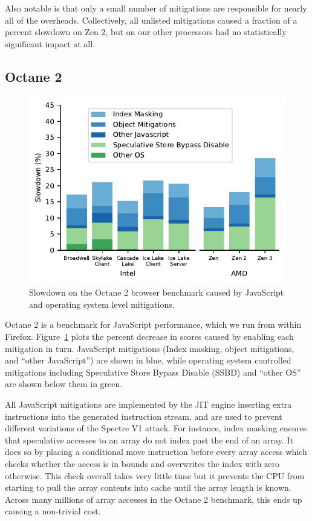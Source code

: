 Also notable is that only a small number of mitigations are responsible for nearly all of the overheads.
Collectively, all unlisted mitigations caused a fraction of a percent slowdown on Zen 2, but on our other processors had no statistically significant impact at all.

\subsection{Octane 2}

\begin{figure}[t]
    \includegraphics[width=\columnwidth]{plots/octane2.pdf}
    \caption{Slowdown on the Octane 2 browser benchmark caused by JavaScript and operating system level mitigations.}
    \label{fig:octane2}
\end{figure}

Octane 2 is a benchmark for JavaScript performance, which we run from within Firefox.
Figure~\ref{fig:octane2} plots the percent decrease in scores caused by enabling each mitigation in turn.
JavaScript mitigations (Index masking, object mitigations, and ``other JavaScript'') are shown in blue, while operating system controlled mitigations including Speculative Store Bypass Disable (SSBD) and ``other OS'' are shown below them in green.

All JavaScript mitigations are implemented by the JIT engine inserting extra instructions into the generated instruction stream, and are used to prevent different variations of the Spectre V1 attack.
For instance, index masking ensures that speculative accesses to an array do not index past the end of an array.
It does so by placing a conditional move instruction before every array access which checks whether the access is in bounds and overwrites the index with zero otherwise.
This check overall takes very little time but it prevents the CPU from starting to pull the array contents into cache until the array length is known.
Across many millions of array accesses in the Octane 2 benchmark, this ends up causing a non-trivial cost.

